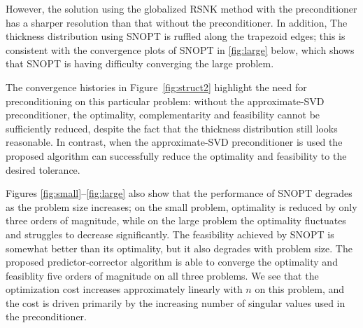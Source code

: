 However, the solution using the globalized RSNK method with the preconditioner has a sharper resolution than that without the preconditioner. In addition, The thickness distribution using SNOPT is ruffled along the trapezoid edges; this is consistent with the convergence plots of SNOPT in \ref{fig:large} below, which shows that SNOPT is having difficulty converging the large problem. 


The convergence histories in Figure~\ref{fig:struct2} highlight the need for preconditioning
on this particular problem: without the approximate-SVD preconditioner, the optimality, complementarity and 
feasibility cannot be sufficiently reduced, despite the fact that the thickness distribution 
still looks reasonable. 
In contrast, when the approximate-SVD preconditioner is used the
proposed algorithm can successfully reduce the optimality 
and feasibility to the desired tolerance.

Figures \ref{fig:small}--\ref{fig:large} also show that the performance of SNOPT
degrades as the problem size increases; on the small problem, optimality is
reduced by only three orders of magnitude, while on the large problem the optimality
fluctuates and struggles to decrease significantly. The feasibility achieved by SNOPT is somewhat better
than its optimality, but it also degrades with problem size.  The proposed
predictor-corrector algorithm is able to converge the optimality and feasiblity
five orders of magnitude on all three problems. We see that the
optimization cost increases approximately linearly with $n$ on this
problem, and the cost is driven primarily by the increasing number of singular values used
in the preconditioner. 

